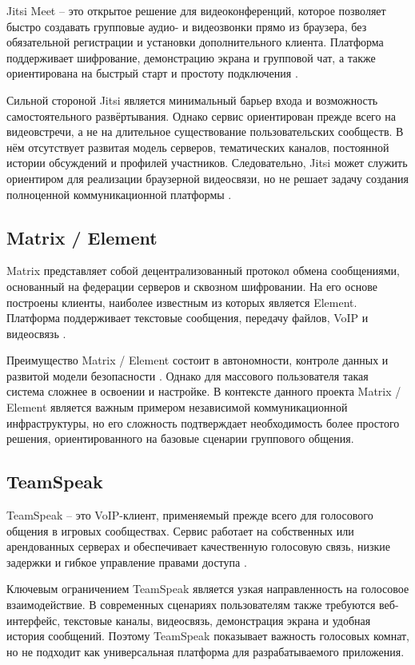 \documentclass[a4paper,12pt]{extarticle}
\begin{document}
Jitsi Meet -- это открытое решение для видеоконференций, которое позволяет быстро создавать групповые аудио- и видеозвонки прямо из браузера, без обязательной регистрации и установки дополнительного клиента. Платформа поддерживает шифрование, демонстрацию экрана и групповой чат, а также ориентирована на быстрый старт и простоту подключения \cite{jitsi}.

Сильной стороной Jitsi является минимальный барьер входа и возможность самостоятельного развёртывания. Однако сервис ориентирован прежде всего на видеовстречи, а не на длительное существование пользовательских сообществ. В нём отсутствует развитая модель серверов, тематических каналов, постоянной истории обсуждений и профилей участников. Следовательно, Jitsi может служить ориентиром для реализации браузерной видеосвязи, но не решает задачу создания полноценной коммуникационной платформы \cite{jitsi_limits}.

\subsection{Matrix / Element}

Matrix представляет собой децентрализованный протокол обмена сообщениями, основанный на федерации серверов и сквозном шифровании. На его основе построены клиенты, наиболее известным из которых является Element. Платформа поддерживает текстовые сообщения, передачу файлов, VoIP и видеосвязь \cite{matrix,element}.

Преимущество Matrix / Element состоит в автономности, контроле данных и развитой модели безопасности \cite{element_privacy}. Однако для массового пользователя такая система сложнее в освоении и настройке. В контексте данного проекта Matrix / Element является важным примером независимой коммуникационной инфраструктуры, но его сложность подтверждает необходимость более простого решения, ориентированного на базовые сценарии группового общения.

\subsection{TeamSpeak}

TeamSpeak -- это VoIP-клиент, применяемый прежде всего для голосового общения в игровых сообществах. Сервис работает на собственных или арендованных серверах и обеспечивает качественную голосовую связь, низкие задержки и гибкое управление правами доступа \cite{teamspeak}.

Ключевым ограничением TeamSpeak является узкая направленность на голосовое взаимодействие. В современных сценариях пользователям также требуются веб-интерфейс, текстовые каналы, видеосвязь, демонстрация экрана и удобная история сообщений. Поэтому TeamSpeak показывает важность голосовых комнат, но не подходит как универсальная платформа для разрабатываемого приложения.
\end{document}
